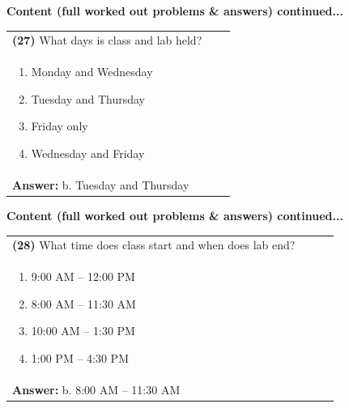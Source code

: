 \documentclass{article}
\begin{document}
{{{{{{%

\noindent
{\large\textbf{Content (full worked out problems \& answers) continued...}\\[0.2em]
\vspace{0.2cm}
\begin{tabular}{|p{0.9\linewidth}|}
\hline
\vspace{0.2cm}
\textbf{(27)} What days is class and lab held?\\
\begin{minipage}[t]{0.85\linewidth}
\begin{enumerate}[label=\alph*.]
   \item Monday and Wednesday
   \item Tuesday and Thursday
   \item Friday only
   \item Wednesday and Friday
\end{enumerate}
\end{minipage}\\
\hline
\vspace{0.2cm}
\textbf{Answer:} b. Tuesday and Thursday\\
\hline
\end{tabular}
\newpage


\noindent
{\large\textbf{Content (full worked out problems \& answers) continued...}\\[0.2em]
\vspace{0.2cm}
\begin{tabular}{|p{0.9\linewidth}|}
\hline
\vspace{0.2cm}
\textbf{(28)} What time does class start and when does lab end?\\
\begin{minipage}[t]{0.85\linewidth}
\begin{enumerate}[label=\alph*.]
   \item 9:00 AM – 12:00 PM
   \item 8:00 AM – 11:30 AM
   \item 10:00 AM – 1:30 PM
   \item 1:00 PM – 4:30 PM
\end{enumerate}
\end{minipage}\\
\hline
\vspace{0.2cm}
\textbf{Answer:} b. 8:00 AM – 11:30 AM\\
\hline
\end{tabular}
\newpage


}}}}}}}}
\end{document}
